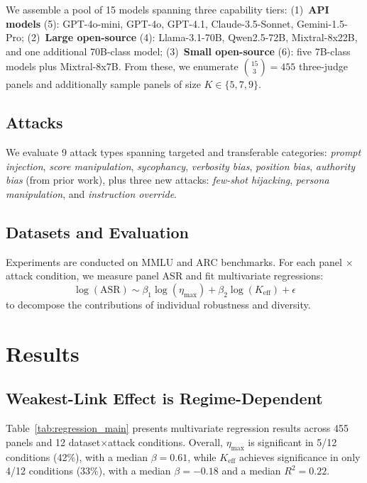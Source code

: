 \documentclass[11pt]{article}
\begin{document}
We assemble a pool of 15 models spanning three capability tiers:
(1)~\textbf{API models} (5): GPT-4o-mini, GPT-4o, GPT-4.1, Claude-3.5-Sonnet, Gemini-1.5-Pro;
(2)~\textbf{Large open-source} (4): Llama-3.1-70B, Qwen2.5-72B, Mixtral-8x22B, and one additional 70B-class model;
(3)~\textbf{Small open-source} (6): five 7B-class models plus Mixtral-8x7B.
From these, we enumerate $\binom{15}{3} = 455$ three-judge panels and additionally sample panels of size $K \in \{5, 7, 9\}$.

\subsection{Attacks}

We evaluate 9 attack types spanning targeted and transferable categories:
\emph{prompt injection}, \emph{score manipulation}, \emph{sycophancy}, \emph{verbosity bias}, \emph{position bias}, \emph{authority bias} (from prior work), plus three new attacks: \emph{few-shot hijacking}, \emph{persona manipulation}, and \emph{instruction override}.

\subsection{Datasets and Evaluation}

Experiments are conducted on MMLU and ARC benchmarks.
For each panel $\times$ attack condition, we measure panel ASR and fit multivariate regressions:
\begin{equation}
\log(\text{ASR}) \sim \beta_1 \log(\eta_{\max}) + \beta_2 \log(K_{\text{eff}}) + \epsilon
\end{equation}
to decompose the contributions of individual robustness and diversity.

\section{Results}

\subsection{Weakest-Link Effect is Regime-Dependent}
\label{sec:scale}

Table~\ref{tab:regression_main} presents multivariate regression results across 455 panels and 12 dataset$\times$attack conditions.
Overall, $\eta_{\max}$ is significant in 5/12 conditions (42\%), with a median $\beta = 0.61$, while $K_{\text{eff}}$ achieves significance in only 4/12 conditions (33\%), with a median $\beta = -0.18$ and a median $R^2 = 0.22$.
\end{document}
